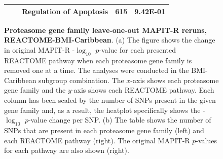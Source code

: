 \begin{figure}[ht]
{{\begin{tabular}{cc|ccc}
 & & Regulation of Apoptosis & 615 & 9.42E-01 \\
  \hline
\end{tabular}}}
\caption[TBD]{\textbf{Proteasome gene family leave-one-out MAPIT-R reruns, REACTOME-BMI-Caribbean}. (a) The figure shows the change in original MAPIT-R -$\log_{10}$ $p$-value for each presented REACTOME pathway when each proteasome gene family is removed one at a time. The analyses were conducted in the BMI-Caribbean subgroup combination. The $x$-axis shows each proteasome gene family and the $y$-axis shows each REACTOME pathway. Each column has been scaled by the number of SNPs present in the given gene family and, as a result, the heatplot specifically shows the -$\log_{10}$ $p$-value change per SNP. (b) The table shows the number of SNPs that are present in each proteasome gene family (left) and each REACTOME pathway (right). The original MAPIT-R $p$-values for each pathway are also shown (right).}
\label{InterPath-Supp-Figure-Prot-Heatplots-Caribbean}
\end{figure}
\clearpage
\addtocounter{figure}{-1}
\addtocounter{CharNumber5}{1}

